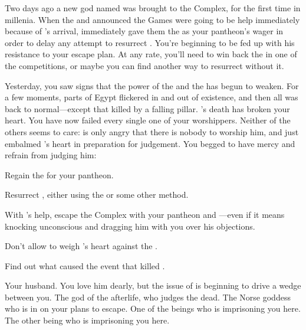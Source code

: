 \documentclass[char]{guardians}
\begin{document}

Two days ago a new god named \cUnity{} was brought to the Complex, for the first time in millenia. When the \cWarden{} and \cCaretaker{} announced the Games were going to be help immediately because of \cUnity{}'s arrival, \cOsiris{} immediately gave them the \iNecro{\MYname} as your pantheon's wager in order to delay any attempt to resurrect \cSet{}. You're beginning to be fed up with his resistance to your escape plan. At any rate, you'll need to win back the \iNecro{\MYname} in one of the competitions, or maybe you can find another way to resurrect \cSet{} without it.

Yesterday, you saw signs that the power of the \cWarden{} and the \cCaretaker{} has begun to weaken. For a few moments, parts of Egypt flickered in and out of existence, and then all was back to normal---except that \cEgyptianHuman{} killed by a falling pillar. \cEgyptianHuman{}'s death has broken your heart. You have now failed every single one of your worshippers. Neither of the others seems to care: \cOsiris{} is only angry that there is nobody to worship him, and \cAnubis{} just embalmed \cEgyptianHuman{}'s heart in preparation for judgement. You begged \cAnubis{} to have mercy and refrain from judging him:

\begin{itemz}[Goals]
  \item Regain the \iNecro{} for your pantheon.
  \item Resurrect \cSet{}, either using the \iNecro{\MYname} or some other method.
  \item With \cSet{}'s help, escape the Complex with your pantheon and \cHel{}---even if it means knocking \cOsiris{} unconscious and dragging him with you over his objections.
  \item Don't allow \cAnubis{} to weigh \cEgyptianHuman{}'s heart against the \iFeather{\MYname}.
  \item Find out what caused the event that killed \cEgyptianHuman{}.
\end{itemz}

\begin{contacts}
  \contact{\cOsiris{}} Your husband. You love him dearly, but the issue of \cSet{} is beginning to drive a wedge between you.
  \contact{\cAnubis{}} The god of the afterlife, who judges the dead.
  \contact{\cHel{}} The Norse goddess who is in on your plans to escape.
  \contact{\cCaretaker{}} One of the beings who is imprisoning you here.
  \contact{\cWarden{}} The other being who is imprisoning you here.
\end{contacts}
\end{document}
